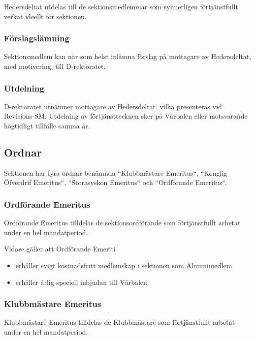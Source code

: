 \documentclass[a4paper,12pt]{article}
\begin{document}
Hedersdeltat utdelas till de sektionsmedlemmar som synnerligen förtjänstfullt verkat ideellt för sektionen.

\subsubsection{Förslagslämning}

Sektionsmedlem kan när som helst inlämna förslag på mottagare av Hedersdeltat, med motivering, till D-rektoratet.

\subsubsection{Utdelning}

D-rektoratet utnämner mottagare av Hedersdeltat, vilka presenteras vid Revisions-SM. Utdelning av förtjänsttecknen sker på Vårbalen eller motsvarande högtidligt tillfälle samma år.

\subsection{Ordnar}

Sektionen har fyra ordnar benämnda ``Klubbmästare Emeritus``,
``Konglig Öfverdrif Emeritus``, ``Storasyskon Emeritus`` och ``Ordförande Emeritus``.

\subsubsection{Ordförande Emeritus}

Ordförande Emeritus tilldelas de sektionsordförande som förtjänstfullt arbetat under en hel mandatperiod.

Vidare gäller att Ordförande Emeriti

\begin{itemize}
  \item erhåller evigt kostnadsfritt medlemskap i sektionen som Alumnimedlem
  \item erhåller årlig speciell inbjudan till Vårbalen.
\end{itemize}

\subsubsection{Klubbmästare Emeritus}

Klubbmästare Emeritus tilldelas de Klubbmästare som förtjänstfullt arbetat under en hel mandatperiod.
\end{document}
